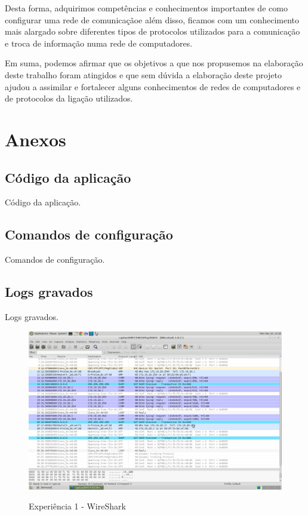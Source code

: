 \documentclass[a4paper]{article}
\begin{document}
Desta forma, adquirimos competências e conhecimentos importantes de como configurar uma rede de comunicaçãoe além disso, ficamos com um conhecimento mais alargado sobre diferentes tipos de protocolos utilizados para a comunicação e troca de informação numa rede de computadores.
 
Em suma, podemos afirmar que os objetivos a que nos propusemos na elaboração deste trabalho foram atingidos e que sem dúvida a elaboração deste projeto ajudou a assimilar e fortalecer alguns conhecimentos de redes de computadores e de protocolos da ligação utilizados.

\clearpage
{}
\renewcommand\refname{Referências}




\newpage
\appendix
\section{Anexos}

\subsection{Código da aplicação}
Código da aplicação.

\subsection{Comandos de configuração}
Comandos de configuração.

\subsection{Logs gravados}
Logs gravados.

\begin{figure}[h!]
\caption{Experiência 1 - WireShark}
\includegraphics[scale=0.25]{res/image2.png}
\label{fig:teste}
\end{figure}
\end{document}
